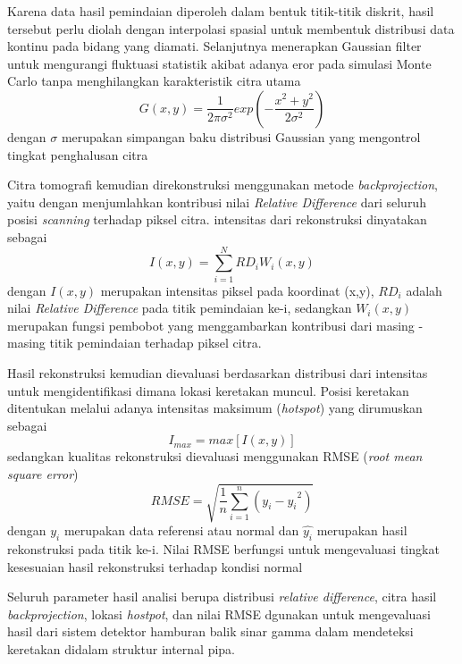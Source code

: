 \documentclass[12pt,a4paper]{report}
\begin{document}
Karena data hasil pemindaian diperoleh dalam bentuk titik-titik diskrit, hasil tersebut perlu diolah dengan interpolasi spasial untuk membentuk distribusi data kontinu pada bidang yang diamati. Selanjutnya menerapkan Gaussian filter untuk mengurangi fluktuasi statistik akibat adanya eror pada simulasi Monte Carlo 
tanpa menghilangkan karakteristik citra utama
\begin{equation}
    G(x,y) = \frac{1}{2\pi\sigma^2} exp(- \frac{x^2 + y^2}{2\sigma^2})
\end{equation}
dengan $\sigma$ merupakan simpangan baku distribusi Gaussian yang mengontrol tingkat penghalusan citra

Citra tomografi kemudian direkonstruksi menggunakan metode \textit{backprojection}, yaitu dengan menjumlahkan kontribusi nilai \textit{Relative Difference} dari seluruh posisi \textit{scanning} terhadap piksel citra. intensitas dari rekonstruksi dinyatakan sebagai
\begin{equation}
    I(x,y) = \sum_{i = 1}^{N} RD_i W_i (x,y)
\end{equation}
dengan $I(x,y)$ merupakan intensitas piksel pada koordinat (x,y), $RD_i$ adalah nilai \textit{Relative Difference} pada titik pemindaian ke-i, sedangkan $W_i(x,y)$ merupakan fungsi pembobot yang menggambarkan kontribusi dari masing - masing titik pemindaian terhadap piksel citra.

Hasil rekonstruksi kemudian dievaluasi berdasarkan distribusi dari intensitas untuk mengidentifikasi dimana lokasi keretakan muncul. Posisi keretakan ditentukan melalui adanya intensitas maksimum (\textit{hotspot}) yang dirumuskan sebagai 
\begin{equation}
    I_{max} = max[I(x,y)]
\end{equation}
sedangkan kualitas rekonstruksi dievaluasi menggunakan RMSE (\textit{root mean square error})
\begin{equation}
    RMSE = \sqrt{\frac{1}{n} \sum_{i = 1}^{n}(y_i - \hat{y_i}^2)}
\end{equation}
dengan $y_i$ merupakan data referensi atau normal dan $\hat{y_i}$ merupakan hasil rekonstruksi pada titik ke-i. Nilai RMSE berfungsi untuk mengevaluasi tingkat kesesuaian hasil rekonstruksi terhadap kondisi normal

Seluruh parameter hasil analisi berupa distribusi \textit{relative difference}, citra hasil \textit{backprojection}, lokasi \textit{hostpot}, dan nilai RMSE dgunakan untuk mengevaluasi hasil dari sistem detektor hamburan balik sinar gamma 
dalam mendeteksi keretakan didalam struktur internal pipa.
\end{document}
